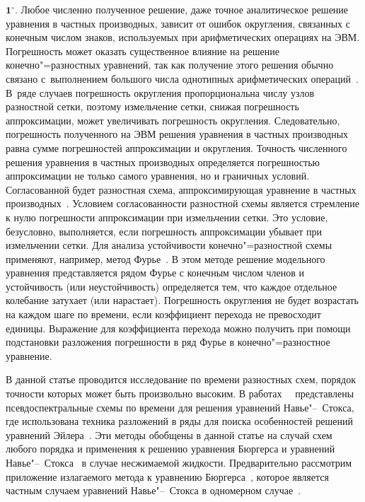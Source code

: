 {$\mathbf 1^\circ.$} Любое численно полученное решение, даже точное аналитическое решение уравнения в частных производных, зависит от ошибок округления, связанных с конечным числом знаков,
используемых при арифметических операциях на ЭВМ. Погрешность
может оказать существенное влияние на решение конечно"=разностных
уравнений, так как получение этого решения обычно связано с~выполнением большого числа однотипных арифметических
операций~\cite{sidnyaev:bib1}. 
В~ряде случаев погрешность округления пропорциональна числу узлов разностной сетки, поэтому
измельчение сетки, снижая погрешность аппроксимации, может
увеличивать погрешность округления. Следовательно, погрешность
полученного на ЭВМ решения уравнения в частных производных равна
сумме погрешностей аппроксимации и округления. Точность численного
решения уравнения в частных производных определяется погрешностью
аппроксимации не только самого уравнения, но и граничных условий.
Согласованной будет разностная схема, аппроксимирующая уравнение в
частных производных~\cite{sidnyaev:bib2}. Условием согласованности
разностной схемы является стремление к нулю погрешности
аппроксимации при измельчении сетки. Это условие, безусловно,
выполняется, если погрешность аппроксимации убывает при
измельчении сетки. Для анализа устойчивости конечно"=разностной
схемы применяют, например, метод
Фурье~\cite{sidnyaev:bib1,sidnyaev:bib2}. В этом методе решение
модельного уравнения представляется рядом Фурье с конечным числом
членов и устойчивость (или неустойчивость) определяется тем, что
каждое отдельное колебание затухает (или нарастает). Погрешность
округления не будет возрастать на каждом шаге по времени, если
коэффициент перехода не превосходит единицы. Выражение для
коэффициента перехода можно получить при помощи подстановки
разложения погрешности в ряд Фурье в конечно"=разностное
уравнение.

В данной статье проводится исследование по времени разностных
схем, порядок точности которых может быть произвольно высоким. В
работах~~\cite{sidnyaev:bib1,sidnyaev:bib2} представлены
псевдоспектральные схемы по времени для решения уравнений
Навье"--~Стокса, где использована техника разложений в ряды для
поиска особенностей решений уравнений Эйлера~\cite{sidnyaev:bib3}.
Эти методы обобщены в данной статье на случай схем любого порядка и применения к решению уравнения Бюргерса и уравнений
Навье"--~Стокса~\cite{sidnyaev:bib4} в случае несжимаемой
жидкости. Предварительно рассмотрим приложение излагаемого метода
к уравнению Бюргерса~\cite{sidnyaev:bib5,sidnyaev:bib6}, которое
является частным случаем уравнений Навье"--~Стокса в одномерном
случае~\cite{sidnyaev:bib7,sidnyaev:bib8}.


